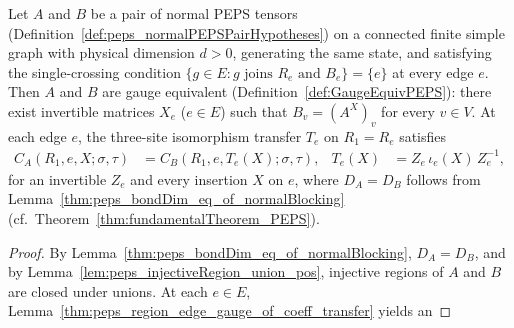 \begin{corollary}%
    \label{thm:fundamentalTheorem_normalPEPS_connected}
    \leanok
    Let $A$ and $B$ be a pair of normal PEPS tensors
    (Definition~\ref{def:peps_normalPEPSPairHypotheses}) on a connected finite
    simple graph with physical dimension $d>0$, generating the same state, and
    satisfying the single-crossing condition
    $\{g\in E:g\text{ joins }R_e\text{ and }B_e\}=\{e\}$ at every edge $e$.
    Then $A$ and $B$ are gauge equivalent (Definition~\ref{def:GaugeEquivPEPS}):
    there exist invertible matrices $X_e$ ($e\in E$) such that $B_v=(A^X)_v$
    for every $v\in V$.
    At each edge $e$, the three-site isomorphism transfer $T_e$ on $R_1=R_e$
    satisfies
    \begin{align}
        C_A(R_1,e,X;\sigma,\tau)
         & =C_B(R_1,e,T_e(X);\sigma,\tau),
         &
        T_e(X)
         & =Z_e\,\iota_e(X)\,Z_e^{-1},
        \label{eq:peps_normal_ft_transfer}
    \end{align}
    for an invertible $Z_e$ and every insertion $X$ on $e$, where $D_A=D_B$
    follows from Lemma~\ref{thm:peps_bondDim_eq_of_normalBlocking}
    \cite[Section~4]{Molnar2018NormalPEPS} (cf.\ Theorem~\ref{thm:fundamentalTheorem_PEPS}).
    \begin{proof}
        \leanok
        By Lemma~\ref{thm:peps_bondDim_eq_of_normalBlocking}, $D_A=D_B$, and
        by Lemma~\ref{lem:peps_injectiveRegion_union_pos}, injective regions of
        $A$ and $B$ are closed under unions. At each $e\in E$,
        Lemma~\ref{thm:peps_region_edge_gauge_of_coeff_transfer} yields an

\end{proof}
\end{corollary}
